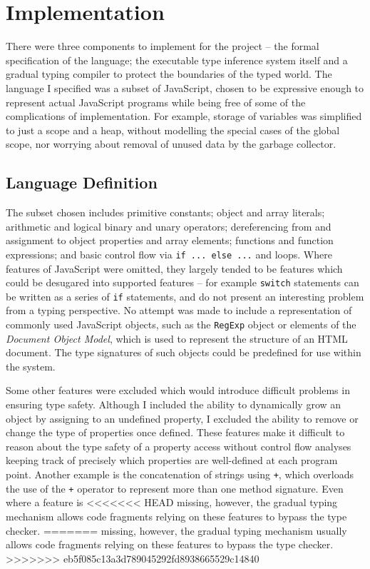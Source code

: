 \documentclass[12pt,a4paper,twoside,openright]{report}
\theoremstyle{definition}
\theoremstyle{dotless}
\newcommand*{\js}{\texttt}
\begin{document}
\chapter{Implementation}\label{implementation}

There were three components to implement for the project -- the formal
specification of the language; the executable type inference system itself and
a gradual typing compiler to protect the boundaries of the typed world.  The
language I specified was a subset of JavaScript, chosen to be expressive enough
to represent actual JavaScript programs while being free of some of the
complications of implementation. For example, storage of variables was
simplified to just a scope and a heap, without modelling the special cases of
the global scope, nor worrying about removal of unused data by the garbage
collector. 

\section{Language Definition}

The subset chosen includes primitive constants; object and array literals;
arithmetic and logical binary and unary operators; dereferencing from and
assignment to object properties and array elements; functions and function expressions; and basic control flow via \js{if ... else ...} and loops.  
Where features of JavaScript were omitted, they largely tended to be features
which could be desugared into supported features -- for example \js{switch}
statements can be written as a series of \js{if} statements, and do not present
an interesting problem from a typing perspective. No attempt was made to
include a representation of commonly used JavaScript objects, such as the
\js{RegExp} object or elements of the \textit{Document Object Model}, which is used to
represent the structure of an HTML document. The type signatures of such objects
could be predefined for use within the system.

Some other features were excluded which would introduce difficult problems in
ensuring type safety.  Although I included the ability to dynamically grow an
object by assigning to an undefined property, I excluded the ability to remove
or change the type of properties once defined. These features
make it difficult to reason about the type safety of a property
access without control flow analyses keeping track of precisely which
properties are well-defined at each program point. Another example is the
concatenation of strings using \js{+}, which overloads the use of the \js{+}
operator to represent more than one method signature. Even where a feature is
<<<<<<< HEAD
missing, however, the gradual typing mechanism allows code fragments
relying on these features to bypass the type checker.
=======
missing, however, the gradual typing mechanism usually allows code fragments
relying on these features to bypass the type checker. 
>>>>>>> eb5f085c13a3d789045292fd8938665529c14840
\end{document}
